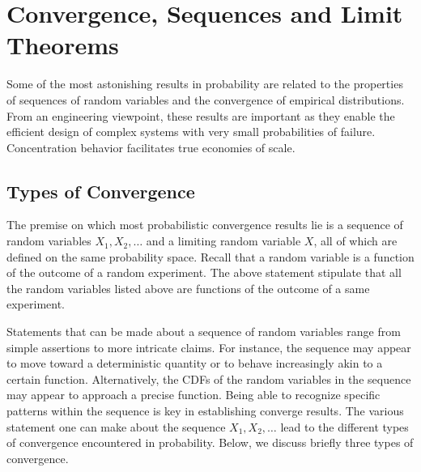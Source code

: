 \chapter{Convergence, Sequences and Limit Theorems}

Some of the most astonishing results in probability are related to the properties of sequences of random variables and the convergence of empirical distributions.
From an engineering viewpoint, these results are important as they enable the efficient design of complex systems with very small probabilities of failure.
Concentration behavior facilitates true economies of scale. 


\section{Types of Convergence}

The premise on which most probabilistic convergence results lie is a sequence of random variables $X_1, X_2, \ldots$ and a limiting random variable $X$, all of which are defined on the same probability space.
Recall that a random variable is a function of the outcome of a random experiment.
The above statement stipulate that all the random variables listed above are functions of the outcome of a same experiment.

Statements that can be made about a sequence of random variables range from simple assertions to more intricate claims.
For instance, the sequence may appear to move toward a deterministic quantity or to behave increasingly akin to a certain function.
Alternatively, the CDFs of the random variables in the sequence may appear to approach a precise function.
Being able to recognize specific patterns within the sequence is key in establishing converge results.
The various statement one can make about the sequence $X_1, X_2, \ldots$ lead to the different types of convergence encountered in probability.
Below, we discuss briefly three types of convergence.

